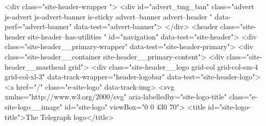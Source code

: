 {{{		
	
<div class="site-header-wrapper ">
<div id="advert_tmg_ban" class="advert js-advert js-advert-banner is-sticky advert--banner advert--header " data-perf="advert-banner" data-test="advert-banner">
</div>
<header class="site-header
				   site-header--has-utilities
				   " id="navigation" data-test="site-header">
<div class="site-header__primary-wrapper" data-test="site-header-primary">
<div class="site-header__container site-header__primary-content">
<div class="site-header__masthead
						grid">
<div class="site-header__logo
								grid-col grid-col-sm-4 grid-col-xl-3" data-track-wrapper="header-logobar" data-test="site-header-logo">
<a href="/" class="e-site-logo" data-track-img>
<svg xmlns="http://www.w3.org/2000/svg" aria-labelledby="site-logo-title" class="e-site-logo__image" id="site-logo" viewBox="0 0 430 70">
<title id="site-logo-title">The Telegraph logo</title>
}}}
